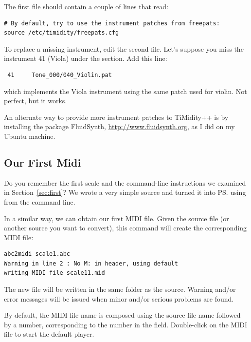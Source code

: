 \documentclass[a4paper,12pt]{book}
\begin{document}
The first file should contain a couple of lines that read:

\begin{verbatim}
# By default, try to use the instrument patches from freepats:
source /etc/timidity/freepats.cfg
\end{verbatim}

To replace a missing instrument, edit the second file. Let's suppose
you miss the instrument 41 (Viola) under the  section.
Add this line:

\begin{verbatim}
 41     Tone_000/040_Violin.pat 
\end{verbatim}

which implements the Viola instrument using the same patch used for
violin. Not perfect, but it works.

An alternate way to provide more instrument patches to TiMidity++ is
by installing the package FluidSynth, \url{http://www.fluidsynth.org},
as I did on my Ubuntu machine.


\subsection{Our First Midi}
\label{sec:firstmidi}

Do you remember the first scale and the command-line instructions we
examined in Section~\ref{sec:first}? We wrote a very simple \ABC{}
source and turned it into \ps{} using \abcm{} from the command line.

In a similar way, we can obtain our first MIDI file. Given the source
file  (or another source you want to convert), this
command will create the corresponding MIDI file:

\begin{verbatim}
abc2midi scale1.abc
Warning in line 2 : No M: in header, using default
writing MIDI file scale11.mid
\end{verbatim}

The new file  will be written in the same folder as
the source. Warning and/or error messages will be issued when minor
and/or serious problems are found.

By default, the MIDI file name is composed using the source file name
followed by a number, corresponding to the number in the 
field. Double-click on the MIDI file to start the default player.

\end{document}
